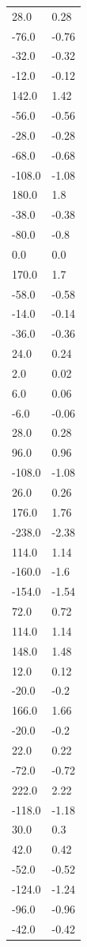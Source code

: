\begin{longtable}{ll}
28.0 & 0.28 \\
-76.0 & -0.76 \\
-32.0 & -0.32 \\
-12.0 & -0.12 \\
142.0 & 1.42 \\
-56.0 & -0.56 \\
-28.0 & -0.28 \\
-68.0 & -0.68 \\
-108.0 & -1.08 \\
180.0 & 1.8 \\
-38.0 & -0.38 \\
-80.0 & -0.8 \\
0.0 & 0.0 \\
170.0 & 1.7 \\
-58.0 & -0.58 \\
-14.0 & -0.14 \\
-36.0 & -0.36 \\
24.0 & 0.24 \\
2.0 & 0.02 \\
6.0 & 0.06 \\
-6.0 & -0.06 \\
28.0 & 0.28 \\
96.0 & 0.96 \\
-108.0 & -1.08 \\
26.0 & 0.26 \\
176.0 & 1.76 \\
-238.0 & -2.38 \\
114.0 & 1.14 \\
-160.0 & -1.6 \\
-154.0 & -1.54 \\
72.0 & 0.72 \\
114.0 & 1.14 \\
148.0 & 1.48 \\
12.0 & 0.12 \\
-20.0 & -0.2 \\
166.0 & 1.66 \\
-20.0 & -0.2 \\
22.0 & 0.22 \\
-72.0 & -0.72 \\
222.0 & 2.22 \\
-118.0 & -1.18 \\
30.0 & 0.3 \\
42.0 & 0.42 \\
-52.0 & -0.52 \\
-124.0 & -1.24 \\
-96.0 & -0.96 \\
-42.0 & -0.42 \\

\end{longtable}
